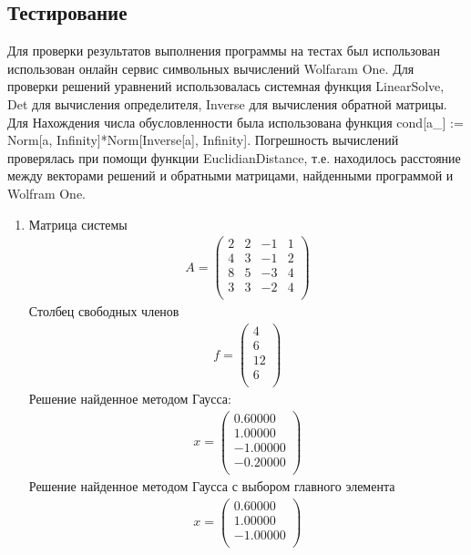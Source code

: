 \documentclass[a4paper,12pt,titlepage,finall]{article}
\begin{document}
\subsection{Тестирование}
Для проверки результатов выполнения программы на тестах был использован использован онлайн сервис символьных вычислений Wolfaram One. Для проверки решений уравнений использовалась системная функция {\ttfamily LinearSolve}, {\ttfamily Det} для вычисления определителя, {\ttfamily Inverse} для вычисления обратной матрицы. Для Нахождения числа обусловленности была использована функция {\ttfamily  cond[a\_] := Norm[a, Infinity]*Norm[Inverse[a], Infinity]}. Погрешность вычислений проверялась при помощи функции {\ttfamily EuclidianDistance}, т.е. находилось расстояние между векторами решений и обратными матрицами, найденными программой и Wolfram One.
\begin{enumerate}
\item
Матрица системы
\begin{align*}
A = \begin{pmatrix}
2&  2&  -1&  1 \\
4&  3&  -1&  2 \\
8&  5&  -3&  4 \\
3&  3&  -2&  4 \\
\end{pmatrix}
\end{align*}
Столбец свободных членов
\begin{align*}
f = \begin{pmatrix}
4 \\
6 \\
12 \\
6 \\
\end{pmatrix}
\end{align*}
Решение найденное методом Гаусса:
\begin{align*}
x = \begin{pmatrix}
0.60000 \\
   1.00000 \\
  -1.00000 \\
  -0.20000 \\
\end{pmatrix}
\end{align*}
Решение найденное методом Гаусса с выбором главного элемента
\begin{align*}
x = \begin{pmatrix}
0.60000 \\
   1.00000 \\
  -1.00000 \\

\end{pmatrix}
\end{align*}
\end{enumerate}
\end{document}
